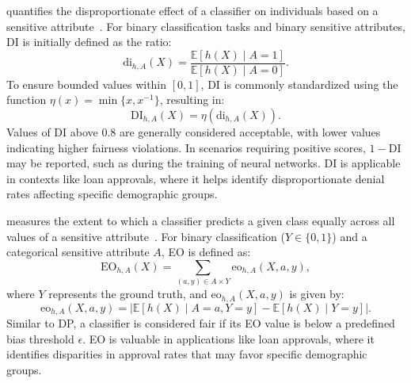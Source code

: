  quantifies the disproportionate effect of a classifier on individuals based on a sensitive attribute~\cite{DBLP:conf/kdd/FeldmanFMSV15}.
%
For binary classification tasks and binary sensitive attributes, \gls{DI} is initially defined as the ratio:
%
\begin{equation}
    \label{eq:di_unbounded}
    \text{di}_{h,A}(X) = \frac{\mathbb{E}[h(X) \mid A = 1]}{\mathbb{E}[h(X) \mid A = 0]}.
\end{equation}
%
To ensure bounded values within \([0, 1]\), DI is commonly standardized using the function \( \eta(x) = \min\{x, x^{-1}\} \), resulting in:
%
\begin{equation}
    \label{eq:di}
    \text{DI}_{h,A}(X) = \eta(\text{di}_{h,A}(X)).
\end{equation}
%
Values of \gls{DI} above \( 0.8 \) are generally considered acceptable, with lower values indicating higher fairness violations.
%
In scenarios requiring positive scores, \( 1 - \text{DI} \) may be reported, such as during the training of neural networks.
%
\Gls{DI} is applicable in contexts like loan approvals, where it helps identify disproportionate denial rates affecting specific demographic groups.


 measures the extent to which a classifier predicts a given class equally across all values of a sensitive attribute~\cite{DBLP:conf/nips/HardtPNS16}.
%
For binary classification (\( Y \in \{0, 1\} \)) and a categorical sensitive attribute \( A \), \gls{EO} is defined as:
%
\begin{equation}
    \label{eq:eo}
    \text{EO}_{h,A}(X) = \sum_{(a, y) \in A \times Y} \text{eo}_{h,A}(X, a, y),
\end{equation}
%
where \( Y \) represents the ground truth, and \( \text{eo}_{h,A}(X, a, y) \) is given by:
%
\begin{equation}
    \label{eq:eo_partial}
    \text{eo}_{h,A}(X, a, y) = \left| \mathbb{E}[h(X) \mid A = a, Y = y] - \mathbb{E}[h(X) \mid Y = y] \right|.
\end{equation}
%
Similar to \gls{DP}, a classifier is considered fair if its \gls{EO} value is below a predefined bias threshold \( \epsilon \).
%
\Gls{EO} is valuable in applications like loan approvals, where it identifies disparities in approval rates that may favor specific demographic groups.



